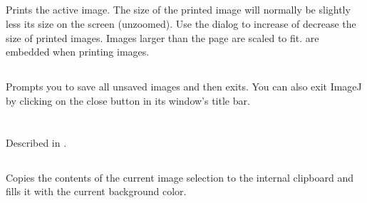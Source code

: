 \subsection{\protect{}\label{sub:Print...[p]}}

Prints the active image. The size of the printed image
will normally be slightly less its size on the screen (unzoomed).
Use the  dialog to increase
of decrease the size of printed images. Images larger than the page
are scaled to fit.  are embedded when
printing images. 


\subsection{\protect{}}

Prompts you to save all unsaved images and then exits. You can also
exit ImageJ by clicking on the close button in its window's
title bar.

\clearpage{}


\section{\protect{}\label{sec:Edit}}


\subsection{\protect{}\label{sub:Undo-[z]}}

Described in {\small {}.}{\small \par}


\subsection{\protect{}\label{sub:Cut[x]}}

Copies the contents of the current image selection to the internal
clipboard and fills it with the current background color.




\subsection{\protect{}\label{sub:Copy[c]}}

